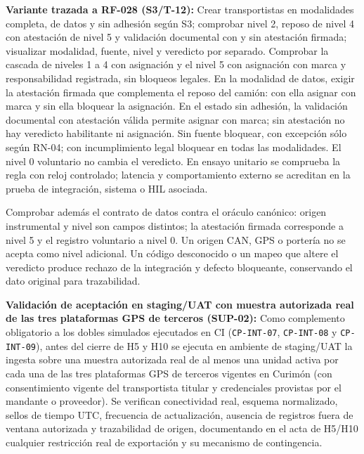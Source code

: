 \par\noindent\textbf{Variante trazada a RF-028 (S3/T-12):} Crear transportistas en modalidades completa, de datos y sin adhesión según S3; comprobar nivel 2, reposo de nivel 4 con atestación de nivel 5 y validación documental con y sin atestación firmada; visualizar modalidad, fuente, nivel y veredicto por separado. Comprobar la cascada de niveles 1 a 4 con asignación y el nivel 5 con asignación con marca y responsabilidad registrada, sin bloqueos legales. En la modalidad de datos, exigir la atestación firmada que complementa el reposo del camión: con ella asignar con marca y sin ella bloquear la asignación. En el estado sin adhesión, la validación documental con atestación válida permite asignar con marca; sin atestación no hay veredicto habilitante ni asignación. Sin fuente bloquear, con excepción sólo según RN-04; con incumplimiento legal bloquear en todas las modalidades. El nivel 0 voluntario no cambia el veredicto. En ensayo unitario se comprueba la regla con reloj controlado; latencia y comportamiento externo se acreditan en la prueba de integración, sistema o HIL asociada.\par

\par\noindent Comprobar además el contrato de datos contra el oráculo canónico: origen instrumental y nivel son campos distintos; la atestación firmada corresponde a nivel 5 y el registro voluntario a nivel 0. Un origen CAN, GPS o portería no se acepta como nivel adicional. Un código desconocido o un mapeo que altere el veredicto produce rechazo de la integración y defecto bloqueante, conservando el dato original para trazabilidad.\par

\par\noindent\textbf{Validación de aceptación en staging/UAT con muestra autorizada real de las tres plataformas GPS de terceros (SUP-02):} Como complemento obligatorio a los dobles simulados ejecutados en CI (\texttt{CP-INT-07}, \texttt{CP-INT-08} y \texttt{CP-INT-09}), antes del cierre de H5 y H10 se ejecuta en ambiente de staging/UAT la ingesta sobre una muestra autorizada real de al menos una unidad activa por cada una de las tres plataformas GPS de terceros vigentes en Curimón (con consentimiento vigente del transportista titular y credenciales provistas por el mandante o proveedor). Se verifican conectividad real, esquema normalizado, sellos de tiempo UTC, frecuencia de actualización, ausencia de registros fuera de ventana autorizada y trazabilidad de origen, documentando en el acta de H5/H10 cualquier restricción real de exportación y su mecanismo de contingencia.\par

